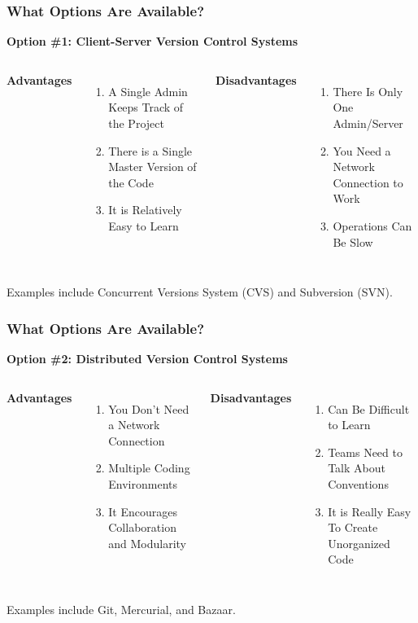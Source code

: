 \begin{frame}
\frametitle{\large{What Options Are Available?}}
\textbf{Option \#1: Client-Server Version Control Systems}
\vspace{8mm}
\begin{columns}[c]
\column{2in}
{\small \textbf{Advantages}}
\begin{enumerate}
\small
\item A Single Admin Keeps Track of the Project
\item There is a Single Master Version of the Code
\item It is Relatively Easy to Learn
\end{enumerate}
\column{2in}
{\small \textbf{Disadvantages} }
\begin{enumerate}
\small
\item There Is Only One Admin/Server
\item You Need a Network Connection to Work
\item Operations Can Be Slow
\end{enumerate}
\end{columns}
\vspace{5mm}
{\small Examples include Concurrent Versions System (CVS) and Subversion (SVN).}
\end{frame}
\note{}

\begin{frame}
\frametitle{\large{What Options Are Available?}}
\textbf{Option \#2: Distributed Version Control Systems}
\vspace{8mm}
\begin{columns}[c]
\column{2in}
{\small \textbf{Advantages}}
\begin{enumerate}
\small
\item You Don't Need a Network Connection
\item Multiple Coding Environments
\item It Encourages Collaboration and Modularity
\end{enumerate}
\column{2in}
{\small \textbf{Disadvantages}}
\begin{enumerate}
\small
\item Can Be Difficult to Learn
\item Teams Need to Talk About Conventions
\item It is Really Easy To Create Unorganized Code
\end{enumerate}
\end{columns}
\vspace{5mm}
{\small Examples include Git, Mercurial, and Bazaar.}
\end{frame}
\note{}

